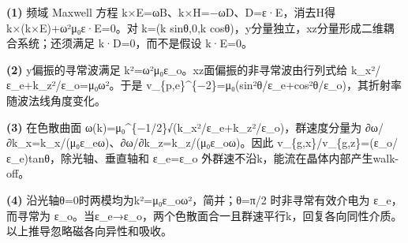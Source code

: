 \par\noindent\textbf{(1)} 频域 Maxwell 方程 k×E=ωB、k×H=−ωD、D=ε·E，消去H得 k×(k×E)+ω²μ₀ε·E=0。对 k=(k sinθ,0,k cosθ)，y分量独立，xz分量形成二维耦合系统；还须满足 k·D=0，而不是假设 k·E=0。
\par\noindent\textbf{(2)} y偏振的寻常波满足 k²=ω²μ₀ε\_o。xz面偏振的非寻常波由行列式给 k\_x²/ε\_e+k\_z²/ε\_o=μ₀ω²。于是 v\_\{p,e\}\textasciicircum{}\{−2\}=μ₀(sin²θ/ε\_e+cos²θ/ε\_o)，其折射率随波法线角度变化。
\par\noindent\textbf{(3)} 在色散曲面 ω(k)=μ₀\textasciicircum{}\{−1/2\}√(k\_x²/ε\_e+k\_z²/ε\_o)，群速度分量为 ∂ω/∂k\_x=k\_x/(μ₀ε\_eω)、∂ω/∂k\_z=k\_z/(μ₀ε\_oω)。因此 v\_\{g,x\}/v\_\{g,z\}=(ε\_o/ε\_e)tanθ，除光轴、垂直轴和 ε\_e=ε\_o 外群速不沿k，能流在晶体内部产生walk-off。
\par\noindent\textbf{(4)} 沿光轴θ=0时两模均为k²=μ₀ε\_oω²，简并；θ=π/2 时非寻常有效介电为 ε\_e，而寻常为 ε\_o。当ε\_e→ε\_o，两个色散面合一且群速平行k，回复各向同性介质。以上推导忽略磁各向异性和吸收。
